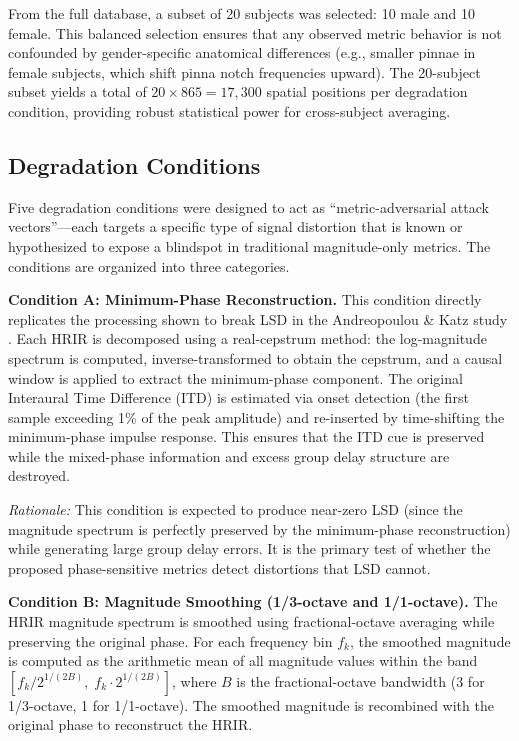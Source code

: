 \documentclass[12pt,a4paper]{article}
\begin{document}
From the full database, a subset of 20 subjects was selected: 10 male and 10 female. This balanced selection ensures that any observed metric behavior is not confounded by gender-specific anatomical differences (e.g., smaller pinnae in female subjects, which shift pinna notch frequencies upward). The 20-subject subset yields a total of $20 \times 865 = 17{,}300$ spatial positions per degradation condition, providing robust statistical power for cross-subject averaging.

\subsection{Degradation Conditions}

Five degradation conditions were designed to act as ``metric-adversarial attack vectors''---each targets a specific type of signal distortion that is known or hypothesized to expose a blindspot in traditional magnitude-only metrics. The conditions are organized into three categories.

\textbf{Condition A: Minimum-Phase Reconstruction.}
This condition directly replicates the processing shown to break LSD in the Andreopoulou \& Katz study \cite{andreopoulou2022}. Each HRIR is decomposed using a real-cepstrum method: the log-magnitude spectrum is computed, inverse-transformed to obtain the cepstrum, and a causal window is applied to extract the minimum-phase component. The original Interaural Time Difference (ITD) is estimated via onset detection (the first sample exceeding 1\% of the peak amplitude) and re-inserted by time-shifting the minimum-phase impulse response. This ensures that the ITD cue is preserved while the mixed-phase information and excess group delay structure are destroyed.

\textit{Rationale:} This condition is expected to produce near-zero LSD (since the magnitude spectrum is perfectly preserved by the minimum-phase reconstruction) while generating large group delay errors. It is the primary test of whether the proposed phase-sensitive metrics detect distortions that LSD cannot.

\textbf{Condition B: Magnitude Smoothing (1/3-octave and 1/1-octave).}
The HRIR magnitude spectrum is smoothed using fractional-octave averaging while preserving the original phase. For each frequency bin $f_k$, the smoothed magnitude is computed as the arithmetic mean of all magnitude values within the band $[f_k / 2^{1/(2B)},\; f_k \cdot 2^{1/(2B)}]$, where $B$ is the fractional-octave bandwidth (3 for 1/3-octave, 1 for 1/1-octave). The smoothed magnitude is recombined with the original phase to reconstruct the HRIR.
\end{document}
